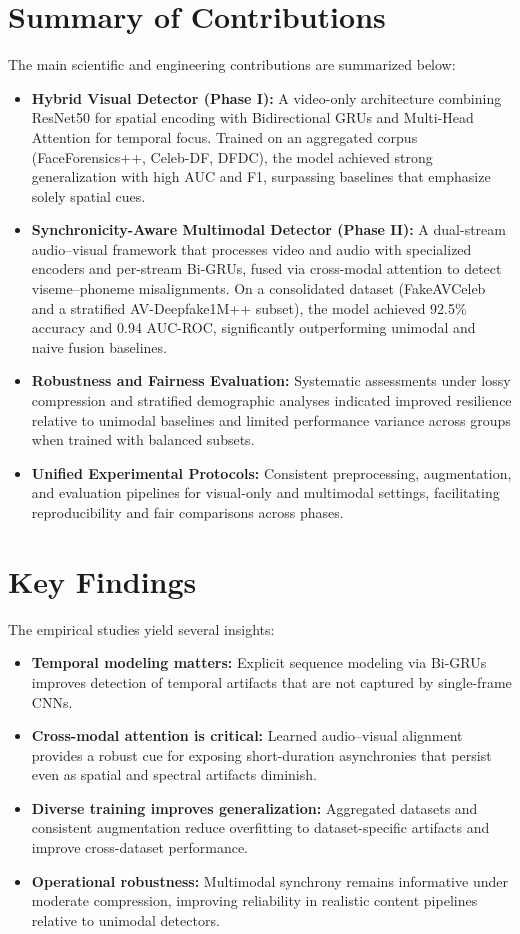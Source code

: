 \section{Summary of Contributions}
The main scientific and engineering contributions are summarized below:
\begin{itemize}
    \item \textbf{Hybrid Visual Detector (Phase I):} A video-only architecture combining ResNet50 for spatial encoding with Bidirectional GRUs and Multi-Head Attention for temporal focus. Trained on an aggregated corpus (FaceForensics++, Celeb-DF, DFDC), the model achieved strong generalization with high AUC and F1, surpassing baselines that emphasize solely spatial cues.
    \item \textbf{Synchronicity-Aware Multimodal Detector (Phase II):} A dual-stream audio--visual framework that processes video and audio with specialized encoders and per-stream Bi-GRUs, fused via cross-modal attention to detect viseme--phoneme misalignments. On a consolidated dataset (FakeAVCeleb and a stratified AV-Deepfake1M++ subset), the model achieved 92.5\% accuracy and 0.94 AUC-ROC, significantly outperforming unimodal and naive fusion baselines.
    \item \textbf{Robustness and Fairness Evaluation:} Systematic assessments under lossy compression and stratified demographic analyses indicated improved resilience relative to unimodal baselines and limited performance variance across groups when trained with balanced subsets.
    \item \textbf{Unified Experimental Protocols:} Consistent preprocessing, augmentation, and evaluation pipelines for visual-only and multimodal settings, facilitating reproducibility and fair comparisons across phases.
\end{itemize}

\section{Key Findings}
The empirical studies yield several insights:
\begin{itemize}
    \item \textbf{Temporal modeling matters:} Explicit sequence modeling via Bi-GRUs improves detection of temporal artifacts that are not captured by single-frame CNNs.
    \item \textbf{Cross-modal attention is critical:} Learned audio--visual alignment provides a robust cue for exposing short-duration asynchronies that persist even as spatial and spectral artifacts diminish.
    \item \textbf{Diverse training improves generalization:} Aggregated datasets and consistent augmentation reduce overfitting to dataset-specific artifacts and improve cross-dataset performance.
    \item \textbf{Operational robustness:} Multimodal synchrony remains informative under moderate compression, improving reliability in realistic content pipelines relative to unimodal detectors.
\end{itemize}


